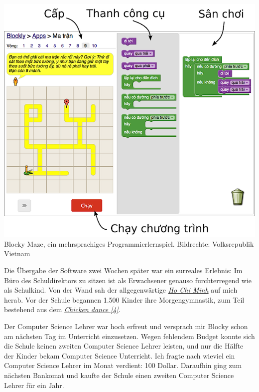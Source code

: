 \documentclass[10pt,a4paper,ngerman,twoside]{article} %
\begin{document}
\begin{multicols}{3}
\begin{center}
\includegraphics[width=\linewidth]{vietnam/vietnam_blocky.png}
\footnotesize{Blocky Maze, ein mehrsprachiges Programmierlernspiel. Bildrechte: Volksrepublik Vietnam}
\end{center}

Die Übergabe der Software zwei Wochen später war ein surreales Erlebnis: Im Büro des Schuldirektors zu sitzen ist als Erwachsener genauso furchterregend wie als Schulkind. Von der Wand sah der allgegenwärtige \href{http://goo.gl/fZATT3}{\textit{Ho Chi Minh}} auf mich herab. Vor der Schule begannen 1.500 Kinder ihre Morgengymnastik, zum Teil bestehend aus dem \href{http://www.youtube.com/watch?v=4xmV5uHWNag}{\textit{Chicken dance [4]}}.

Der Computer Science Lehrer war hoch erfreut und versprach mir Blocky schon am nächsten Tag im Unterricht einzusetzen. Wegen fehlendem Budget konnte sich die Schule keinen zweiten Computer Science Lehrer leisten, und nur die Hälfte der Kinder bekam Computer Science Unterricht. Ich fragte nach wieviel ein Computer Science Lehrer im Monat verdient: 100 Dollar. Daraufhin ging zum nächsten Bankomat und kaufte der Schule einen zweiten Computer Science Lehrer für ein Jahr.


\end{multicols}
\end{document}
